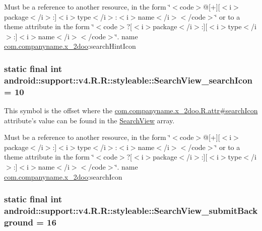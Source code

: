 Must be a reference to another resource, in the form \char`\"{}$<$code$>$@\mbox{[}+\mbox{]}\mbox{[}$<$i$>$package$<$/i$>$:\mbox{]}$<$i$>$type$<$/i$>$:$<$i$>$name$<$/i$>$$<$/code$>$\char`\"{} or to a theme attribute in the form \char`\"{}$<$code$>$?\mbox{[}$<$i$>$package$<$/i$>$:\mbox{]}\mbox{[}$<$i$>$type$<$/i$>$:\mbox{]}$<$i$>$name$<$/i$>$$<$/code$>$\char`\"{}.  name \hyperlink{namespacecom_1_1companyname_1_1x__2doo}{com.companyname.x\_\-2doo}:searchHintIcon \hypertarget{classandroid_1_1support_1_1v4_1_1_r_1_1styleable_2e407a80c6bca332a7b5c0632369c9dd}{
\subsubsection[{SearchView\_\-searchIcon}]{\setlength{\rightskip}{0pt plus 5cm}static final int android::support::v4.R.R::styleable::SearchView\_\-searchIcon = 10}}
\label{classandroid_1_1support_1_1v4_1_1_r_1_1styleable_2e407a80c6bca332a7b5c0632369c9dd}


This symbol is the offset where the \hyperlink{classcom_1_1companyname_1_1x__2doo_1_1_r_1_1attr_b50faccdd8a163ce6488535f51699d2c}{com.companyname.x\_\-2doo.R.attr\#searchIcon} attribute's value can be found in the \hyperlink{classandroid_1_1support_1_1v4_1_1_r_1_1styleable_63a589da97c59fb7eebd9759edb31f0d}{SearchView} array.

Must be a reference to another resource, in the form \char`\"{}$<$code$>$@\mbox{[}+\mbox{]}\mbox{[}$<$i$>$package$<$/i$>$:\mbox{]}$<$i$>$type$<$/i$>$:$<$i$>$name$<$/i$>$$<$/code$>$\char`\"{} or to a theme attribute in the form \char`\"{}$<$code$>$?\mbox{[}$<$i$>$package$<$/i$>$:\mbox{]}\mbox{[}$<$i$>$type$<$/i$>$:\mbox{]}$<$i$>$name$<$/i$>$$<$/code$>$\char`\"{}.  name \hyperlink{namespacecom_1_1companyname_1_1x__2doo}{com.companyname.x\_\-2doo}:searchIcon \hypertarget{classandroid_1_1support_1_1v4_1_1_r_1_1styleable_699aa92aa27e99d69cc974bc01481aea}{
\subsubsection[{SearchView\_\-submitBackground}]{\setlength{\rightskip}{0pt plus 5cm}static final int android::support::v4.R.R::styleable::SearchView\_\-submitBackground = 16}}
\label{classandroid_1_1support_1_1v4_1_1_r_1_1styleable_699aa92aa27e99d69cc974bc01481aea}


